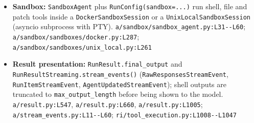 \begin{itemize}
\item \textbf{Sandbox:} \texttt{SandboxAgent} plus \texttt{RunConfig(\allowbreak{}sandbox=.\allowbreak{}.\allowbreak{}.\allowbreak{})} run shell, file and patch tools inside a \texttt{DockerSandboxSession} or a \texttt{UnixLocalSandboxSession} (asyncio subprocess with PTY). \texttt{a/\allowbreak{}sandbox/\allowbreak{}sandbox\_\allowbreak{}agent.\allowbreak{}py:\allowbreak{}L31-\allowbreak{}-\allowbreak{}L60}; \texttt{a/\allowbreak{}sandbox/\allowbreak{}sandboxes/\allowbreak{}docker.\allowbreak{}py:\allowbreak{}L287}; \texttt{a/\allowbreak{}sandbox/\allowbreak{}sandboxes/\allowbreak{}unix\_\allowbreak{}local.\allowbreak{}py:\allowbreak{}L261}
\item \textbf{Result presentation:} \texttt{RunResult.\allowbreak{}final\_\allowbreak{}output} and \texttt{RunResultStreaming.\allowbreak{}stream\_\allowbreak{}events(\allowbreak{})} (\texttt{RawResponsesStreamEvent}, \texttt{RunItemStreamEvent}, \texttt{AgentUpdatedStreamEvent}); shell outputs are truncated to \texttt{max\_\allowbreak{}output\_\allowbreak{}length} before being shown to the model. \texttt{a/\allowbreak{}result.\allowbreak{}py:\allowbreak{}L547}, \texttt{a/\allowbreak{}result.\allowbreak{}py:\allowbreak{}L660}, \texttt{a/\allowbreak{}result.\allowbreak{}py:\allowbreak{}L1005}; \texttt{a/\allowbreak{}stream\_\allowbreak{}events.\allowbreak{}py:\allowbreak{}L11-\allowbreak{}-\allowbreak{}L60}; \texttt{ri/\allowbreak{}tool\_\allowbreak{}execution.\allowbreak{}py:\allowbreak{}L1008-\allowbreak{}-\allowbreak{}L1047}
\end{itemize}

